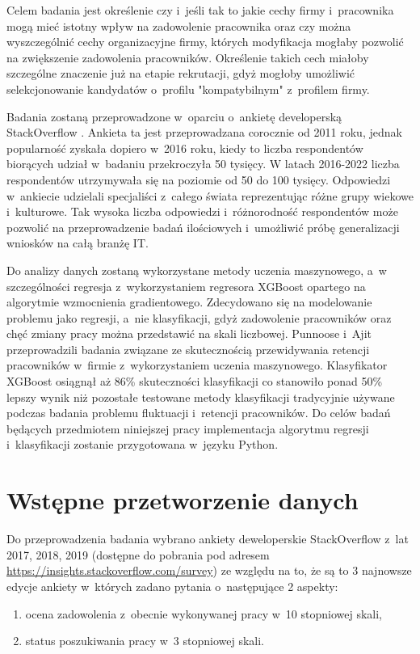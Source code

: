 Celem badania jest określenie czy i~jeśli tak to jakie cechy firmy i~pracownika mogą mieć istotny wpływ na zadowolenie pracownika
oraz czy można wyszczególnić cechy organizacyjne firmy, których modyfikacja mogłaby pozwolić na zwiększenie zadowolenia pracowników.
Określenie takich cech miałoby szczególne znaczenie już na etapie rekrutacji, gdyż mogłoby umożliwić selekcjonowanie kandydatów o~profilu "kompatybilnym" z~profilem firmy.


Badania zostaną przeprowadzone w~oparciu o~ankietę developerską StackOverflow \cite{so-survey-info}.
Ankieta ta jest przeprowadzana corocznie od 2011 roku, jednak popularność zyskała dopiero w~2016 roku, kiedy to liczba respondentów biorących udział w~badaniu przekroczyła 50 tysięcy.
W latach 2016-2022 liczba respondentów utrzymywała się na poziomie od 50 do 100 tysięcy.
Odpowiedzi w~ankiecie udzielali specjaliści z~całego świata reprezentując różne grupy wiekowe i~kulturowe.
Tak wysoka liczba odpowiedzi i~różnorodność respondentów może pozwolić na przeprowadzenie badań ilościowych i~umożliwić próbę generalizacji wniosków na całą branżę IT.


Do analizy danych zostaną wykorzystane metody uczenia maszynowego, a~w szczególności regresja z~wykorzystaniem regresora XGBoost opartego na algorytmie wzmocnienia gradientowego.
Zdecydowano się na modelowanie problemu jako regresji, a~nie klasyfikacji, gdyż zadowolenie pracowników oraz chęć zmiany pracy można przedstawić na skali liczbowej.
Punnoose i~Ajit \cite{punnoose-2016} przeprowadzili badania związane ze skutecznością przewidywania retencji pracowników w~firmie z~wykorzystaniem uczenia maszynowego.
Klasyfikator XGBoost osiągnął aż 86\% skuteczności klasyfikacji co stanowiło ponad 50\% lepszy wynik niż pozostałe testowane metody klasyfikacji tradycyjnie używane podczas badania problemu fluktuacji i~retencji pracowników.
Do celów badań będących przedmiotem niniejszej pracy implementacja algorytmu regresji i~klasyfikacji zostanie przygotowana w~języku Python.


\section{Wstępne przetworzenie danych}\label{sec:analysis:preprocessing}
Do przeprowadzenia badania wybrano ankiety deweloperskie StackOverflow z~lat 2017, 2018, 2019 (dostępne do pobrania pod adresem \url{https://insights.stackoverflow.com/survey}) ze względu na to, że są to 3 najnowsze edycje ankiety w~których zadano pytania o~następujące 2 aspekty:
\begin{enumerate}
    \item ocena zadowolenia z~obecnie wykonywanej pracy w~10 stopniowej skali,
    \item status poszukiwania pracy w~3 stopniowej skali.
\end{enumerate}

